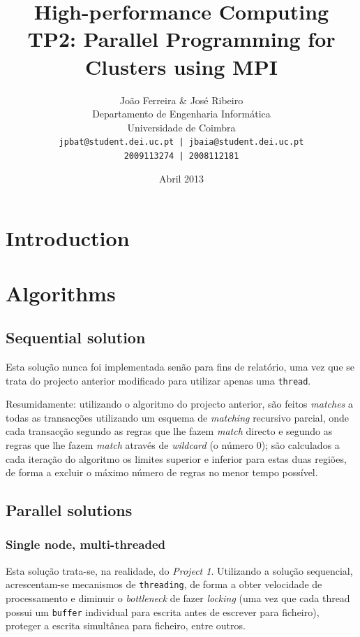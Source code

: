 \documentclass[a4paper]{article}
\title{High-performance Computing \\ TP2: Parallel Programming for Clusters using MPI}
\author{João Ferreira \& José Ribeiro\\
		Departamento de Engenharia Informática\\
		Universidade de Coimbra\\
		\texttt{jpbat@student.dei.uc.pt | jbaia@student.dei.uc.pt}\\
		\texttt{2009113274 | 2008112181}}
\date{Abril 2013}
\begin{document}
\maketitle

\cleardoublepage

\tableofcontents
\cleardoublepage

\setlength{\parindent}{1cm}
\setlength{\parskip}{0.3cm}

\section{Introduction}
\clearpage

\section{Algorithms}
\subsection{Sequential solution}
\indent \indent Esta solução nunca foi implementada senão para fins de relatório, uma vez que se trata do projecto anterior modificado para utilizar apenas uma \texttt{thread}.

Resumidamente: utilizando o algoritmo do projecto anterior, são feitos \textit{matches} a todas as transacções utilizando um esquema de \textit{matching} recursivo parcial, onde cada transacção segundo as regras que lhe fazem \textit{match} directo e segundo as regras que lhe fazem \textit{match} através de \textit{wildcard} (o número 0); são calculados a cada iteração do algoritmo os limites superior e inferior para estas duas regiões, de forma a excluir o máximo número de regras no menor tempo possível.

\subsection{Parallel solutions}
\subsubsection{Single node, multi-threaded}
\indent \indent Esta solução trata-se, na realidade, do \textit{Project 1}. Utilizando a solução sequencial, acrescentam-se mecanismos de \texttt{threading}, de forma a obter velocidade de processamento e diminuir o \textit{bottleneck} de fazer \textit{locking} (uma vez que cada thread possui um \texttt{buffer} individual para escrita antes de escrever para ficheiro), proteger a escrita simultânea para ficheiro, entre outros.
\end{document}
